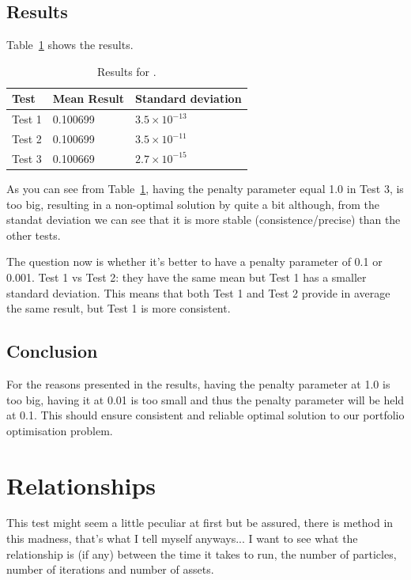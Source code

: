 \documentclass{pdfmx4020}
\begin{document}
    \subsection{Results}
      Table~\ref{table:penalty_results} shows the results. 
        \begin{table}[H]
          \setlength{\extrarowheight}{2.0pt}
          \begin{tabular}{|l|l|l|}
            \hline
            Test & Mean Result & Standard deviation \\
            \hline
            Test 1 & 0.100699 & $3.5\times10^{-13}$ \\
            \hline
            Test 2 & 0.100699 & $3.5\times10^{-11}$ \\
            \hline
            Test 3 & 0.100669 & $2.7\times10^{-15}$ \\
            \hline
          \end{tabular}
          \caption{Results for .}
          \label{table:penalty_results}
        \end{table}
      As you can see from Table~\ref{table:penalty_results}, having the penalty parameter equal 1.0 in Test 3, is too big, resulting in a non-optimal solution by quite a bit although, from the standat deviation we can see that it is more stable (consistence/precise) than the other tests. 

      The question now is whether it's better to have a penalty parameter of 0.1 or 0.001. Test 1 vs Test 2: they have the same mean but Test 1 has a smaller standard deviation. This means that both Test 1 and Test 2 provide in average the same result, but Test 1 is more consistent.

    \subsection{Conclusion}
      For the reasons presented in the results, having the penalty parameter at 1.0 is too big, having it at 0.01 is too small and thus the penalty parameter will be held at 0.1. This should ensure consistent and reliable optimal solution to our portfolio optimisation problem.

  \section{Relationships} %
  \label{sec:relationships}
  This test might seem a little peculiar at first but be assured, there is method in this madness, that's what I tell myself anyways... I want to see what the relationship is (if any) between the time it takes to run, the number of particles, number of iterations and number of assets.
\end{document}
